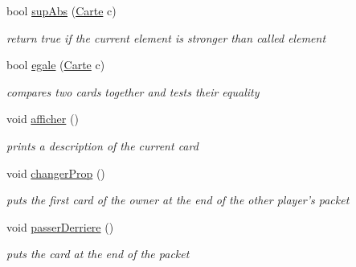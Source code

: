 \begin{DoxyCompactItemize}
bool \hyperlink{class_carte_a86374a9ff2cf25ed3cecfe9d4025e230}{supAbs} (\hyperlink{class_carte}{Carte} c)
\begin{DoxyCompactList}\small\item\em return true if the current element is stronger than called element \item\end{DoxyCompactList}\item 
bool \hyperlink{class_carte_a4161154e1d88672d5ef2230e86d2dcec}{egale} (\hyperlink{class_carte}{Carte} c)
\begin{DoxyCompactList}\small\item\em compares two cards together and tests their equality \item\end{DoxyCompactList}\item 
\hypertarget{class_carte_a007f478e6e0efb44fb4421a94bdacf65}{
void \hyperlink{class_carte_a007f478e6e0efb44fb4421a94bdacf65}{afficher} ()}
\label{class_carte_a007f478e6e0efb44fb4421a94bdacf65}

\begin{DoxyCompactList}\small\item\em prints a description of the current card \item\end{DoxyCompactList}\item 
\hypertarget{class_carte_a5debebf002512c0b1157753077dc323a}{
void \hyperlink{class_carte_a5debebf002512c0b1157753077dc323a}{changerProp} ()}
\label{class_carte_a5debebf002512c0b1157753077dc323a}

\begin{DoxyCompactList}\small\item\em puts the first card of the owner at the end of the other player's packet \item\end{DoxyCompactList}\item 
\hypertarget{class_carte_a68b30935dec56e2f4ace695d8a0a547e}{
void \hyperlink{class_carte_a68b30935dec56e2f4ace695d8a0a547e}{passerDerriere} ()}
\label{class_carte_a68b30935dec56e2f4ace695d8a0a547e}

\begin{DoxyCompactList}\small\item\em puts the card at the end of the packet \item\end{DoxyCompactList}\end{DoxyCompactItemize}
